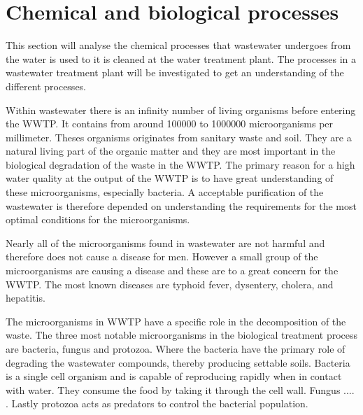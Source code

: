 \section{Chemical and biological processes}\label{se:chemical_process}
This section will analyse the chemical processes that wastewater undergoes from the water is used to it is cleaned at the water treatment plant. The processes in a wastewater treatment plant will be investigated to get an understanding of the different processes. %

Within wastewater there is an infinity number of living organisms before entering the WWTP. It contains from around 100000 to 1000000 microorganisms per millimeter. Theses organisms originates from sanitary waste and soil. They are a natural living part of the organic matter and they are most important in the biological degradation of the waste in the WWTP. The primary reason for a high water quality at the output of the WWTP is to have great understanding of these microorganisms, especially bacteria. A acceptable purification of the wastewater is therefore depended on understanding the requirements for the most optimal conditions for the microorganisms. 

Nearly all of the microorganisms found in wastewater are not harmful and therefore does not cause a disease for men. However a small group of the microorganisms are causing a disease and these are to a great concern for the WWTP. The most known diseases are typhoid fever, dysentery, cholera, and hepatitis.

The microorganisms in WWTP have a specific role in the decomposition of the waste. The three most notable microorganisms in the biological treatment process are bacteria, fungus and protozoa. Where the bacteria have the primary role of degrading the wastewater compounds, thereby producing settable soils. Bacteria is a single cell organism and is capable of reproducing rapidly when in contact with water. They consume the food by taking it through the cell wall. Fungus .... .  Lastly protozoa acts as predators to control the bacterial population. 

